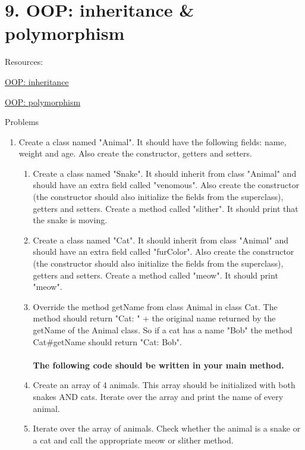\documentclass[12pt,letterpaper]{article}
\newcommand\hwnumber{9}
\begin{document}
\section*{\hwnumber. OOP: inheritance \&  polymorphism}
Resources:
\begin{description}
    \item \href{http://tutorials.jenkov.com/java/inheritance.html}{OOP: inheritance}
    \item \href{https://www.w3schools.com/java/java_polymorphism.asp}{OOP: polymorphism}
\end{description}


Problems
\begin{enumerate}
\item
Create a class named "Animal". It should have the following fields: name, weight and age. Also create the
constructor, getters and setters.
\begin{enumerate}
\item
Create a class named "Snake". It should inherit from class "Animal" and should have an extra field called
"venomous". Also create the constructor (the constructor should also initialize the fields from the superclass), getters and setters. Create a method called "slither". It should print that the snake is moving.

\item
Create a class named "Cat". It should inherit from class "Animal" and should have an extra field called
"furColor". Also create the constructor (the constructor should also initialize the fields from the superclass), getters and setters. Create a method called "meow". It should print "meow".

\item
Override the method getName from class Animal in class Cat. The method should return "Cat: " + the original name returned by the getName of the Animal class. So if a cat has a name "Bob" the method Cat\#getName should return "Cat: Bob".
\\ \\
\textbf{The following code should be written in your main method.}
\item
Create an array of 4 animals. This array should be initialized with both snakes AND cats. Iterate over the array and print the name of every animal.

\item
Iterate over the array of animals. Check whether the animal is a snake or a cat and call the appropriate meow or slither method.


\end{enumerate}
\end{enumerate}
\end{document}
